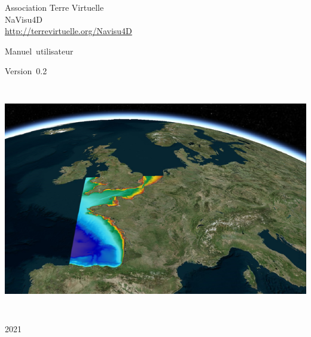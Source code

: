 \begin{titlepage}
\begin{center}
{\LARGE\sc Association Terre Virtuelle}\\
\vspace{2cm}
\mbox{\LARGE \sc NaVisu4D}\\
\vspace{1cm}
\href{https://terrevirtuelle.org/Navisu4D}{http://terrevirtuelle.org/Navisu4D}

\vspace{1cm}
\mbox{\LARGE \sc Manuel utilisateur}\\
\vspace{0.5cm}

\mbox{\LARGE \sc Version 0.2 }\\
\vspace{0.5cm}

\begin{bfseries}

\begin{Huge}
\soustitre
\end{Huge}

\vspace{.8cm}

\null\vfill


\begin{center}
	\includegraphics[width=16cm, height=10cm]{images/navisu4D_v2.png}
\end{center}

\null\vfill

\vspace{1cm}
2021

\end{bfseries}
\end{center}

\end{titlepage}

\hbox{}

